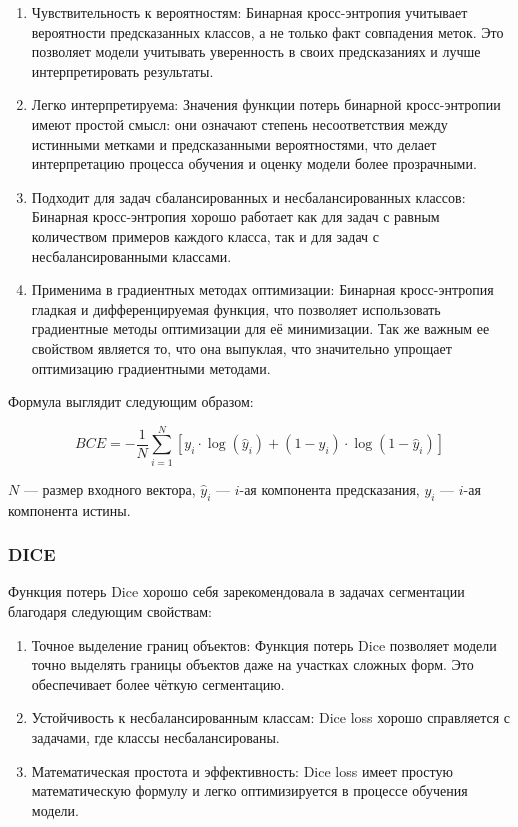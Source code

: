 \begin{enumerate}
	\item Чувствительность к вероятностям: Бинарная кросс-энтропия учитывает
	вероятности предсказанных классов, а не только факт совпадения меток. Это
	позволяет модели учитывать уверенность в своих предсказаниях и лучше
	интерпретировать результаты.

	\item Легко интерпретируема: Значения функции потерь бинарной
	кросс-энтропии имеют простой смысл: они означают степень несоответствия
	между истинными метками и предсказанными вероятностями, что делает
	интерпретацию процесса обучения и оценку модели более прозрачными.

	\item Подходит для задач сбалансированных и несбалансированных классов:
	Бинарная кросс-энтропия хорошо работает как для задач с равным количеством
	примеров каждого класса, так и для задач с несбалансированными классами.

	\item Применима в градиентных методах оптимизации: Бинарная кросс-энтропия
	гладкая и дифференцируемая функция, что позволяет использовать градиентные
	методы оптимизации для её минимизации. Так же важным ее свойством является
	то, что она выпуклая, что значительно упрощает оптимизацию градиентными
	методами.


\end{enumerate}

Формула выглядит следующим образом:

\begin{equation}
	BCE = - \frac{1}{N} \sum_{i=1}^{N} \left[ y_i \cdot \log(\hat{y}_i) + (1 - y_i)
		\cdot \log(1 - \hat{y}_i) \right]
	\label{eq:bce}
\end{equation}

\noindent $N$ --- размер входного вектора, $\hat{y}_i$ --- $i$-ая компонента
предсказания, $y_i$ --- $i$-ая компонента истины.

\subsubsection{DICE}

Функция потерь Dice хорошо себя зарекомендовала в задачах сегментации благодаря
следующим свойствам:

\begin{enumerate}

	\item Точное выделение границ объектов: Функция потерь Dice позволяет
	модели точно выделять границы объектов даже на участках сложных форм. Это
	обеспечивает более чёткую сегментацию.

	\item Устойчивость к несбалансированным классам: Dice loss хорошо
	справляется с задачами, где классы несбалансированы.

	\item Математическая простота и эффективность: Dice loss имеет простую
	математическую формулу и легко оптимизируется в процессе обучения модели.

\end{enumerate}

